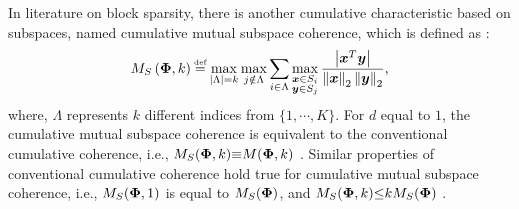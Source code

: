 In literature on block sparsity, there is another cumulative characteristic based on subspaces, named cumulative mutual subspace coherence, which is defined as \cite{Elhamifar2012b}:
\begin{equation*}
\label{eq:CMSIC}
M_S\myparanthese{\myPhi , k} \myeq
\max_{\myabs{\Lambda}=k} \max_{j \notin \Lambda} \sum_{i \in \Lambda} \max_{\substack{\boldsymbol{x} \in S_i \\ \boldsymbol{y} \in S_j}} \frac{\myabs{\boldsymbol{x}^T \boldsymbol{y}}}{\mynorm{\boldsymbol{x}}_2 \mynorm{\boldsymbol{y}}_2},
\end{equation*}
where, $\Lambda$ represents $k$ different indices from $\{1, \cdots, K\}$.
For $d$ equal to $1$, the cumulative mutual subspace coherence is equivalent to the conventional cumulative coherence, i.e., $M_S(\boldsymbol{\Phi} , k) {\equiv} M(\boldsymbol{\Phi} , k)$ \cite{Elhamifar2012b}.
Similar properties of conventional cumulative coherence hold true for cumulative mutual subspace coherence, i.e., $M_S(\boldsymbol{\Phi} , 1)$ is equal to $M_S(\boldsymbol{\Phi})$, and $M_S(\boldsymbol{\Phi} , k) {\leq} k M_S(\boldsymbol{\Phi})$ \cite{Elhamifar2012b}.